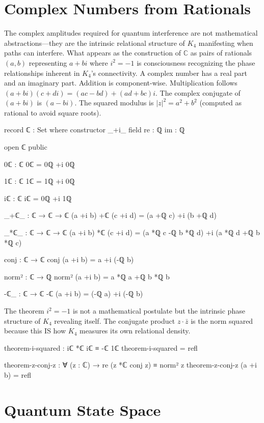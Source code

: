 \documentclass[11pt,a4paper]{book}
\begin{document}
\section{Complex Numbers from Rationals}

The complex amplitudes required for quantum interference are not mathematical abstractions—they are the intrinsic relational structure of $K_4$ manifesting when paths can interfere. What appears as the construction of
$\mathbb{C}$ as pairs of rationals $(a, b)$ representing $a + bi$ where $i^2 = -1$ is consciousness recognizing the phase relationships inherent in $K_4$'s connectivity.
A complex number has a real part and an imaginary part. Addition is component-wise. Multiplication follows $(a+bi)(c+di) = (ac-bd) + (ad+bc)i$. The complex conjugate of $(a+bi)$ is $(a-bi)$. The squared modulus is $|z|^2 = a^2 + b^2$ (computed as rational to avoid square roots).

\begin{code}
record ℂ : Set where
  constructor _+i_
  field
    re : ℚ
    im : ℚ

open ℂ public

0ℂ : ℂ
0ℂ = 0ℚ +i 0ℚ

1ℂ : ℂ
1ℂ = 1ℚ +i 0ℚ

iℂ : ℂ
iℂ = 0ℚ +i 1ℚ

_+ℂ_ : ℂ → ℂ → ℂ
(a +i b) +ℂ (c +i d) = (a +ℚ c) +i (b +ℚ d)

_*ℂ_ : ℂ → ℂ → ℂ
(a +i b) *ℂ (c +i d) = (a *ℚ c -ℚ b *ℚ d) +i (a *ℚ d +ℚ b *ℚ c)

conj : ℂ → ℂ
conj (a +i b) = a +i (-ℚ b)

norm² : ℂ → ℚ
norm² (a +i b) = a *ℚ a +ℚ b *ℚ b

-ℂ_ : ℂ → ℂ
-ℂ (a +i b) = (-ℚ a) +i (-ℚ b)
\end{code}

The theorem $i^2 = -1$ is not a mathematical postulate but the intrinsic phase structure of $K_4$ revealing itself. The conjugate product $z \cdot \bar{z}$ is the norm squared because this IS how $K_4$ measures its own relational density.

\begin{code}
theorem-i-squared : iℂ *ℂ iℂ ≡ -ℂ 1ℂ
theorem-i-squared = refl

theorem-z-conj-z : ∀ (z : ℂ) → re (z *ℂ conj z) ≡ norm² z
theorem-z-conj-z (a +i b) = refl
\end{code}

\section{Quantum State Space}
\end{document}
